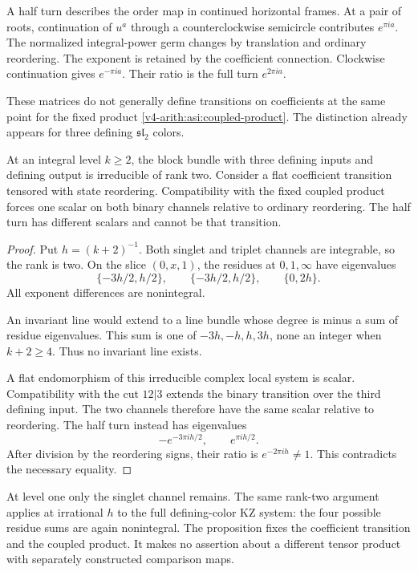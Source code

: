 A half turn describes the order map in continued horizontal
frames. At a pair of roots, continuation of \(u^a\) through a
counterclockwise semicircle contributes \(e^{\pi ia}\).
The normalized integral-power germ changes by translation and
ordinary reordering. The exponent is retained by the coefficient
connection. Clockwise continuation gives \(e^{-\pi ia}\).
Their ratio is the full turn \(e^{2\pi ia}\).

These matrices do not generally define transitions on coefficients
at the same point for the fixed product
\eqref{v4-arith:asi:coupled-product}. The distinction already
appears for three defining \(\mathfrak{sl}_2\) colors.

\begin{proposition}\label{v4-arith:asi:half-turn-obstruction}
At an integral level \(k\ge2\), the block bundle with three
defining inputs and defining output is irreducible of rank two.
Consider a flat coefficient transition tensored with state
reordering. Compatibility with the fixed coupled product forces
one scalar on both binary channels relative to ordinary reordering.
The half turn has different scalars and cannot be that transition.
\end{proposition}

\begin{proof}
Put \(h=(k+2)^{-1}\). Both singlet and triplet channels are
integrable, so the rank is two. On the slice \((0,x,1)\),
the residues at \(0,1,\infty\) have eigenvalues
\[
 \{-3h/2,h/2\},\qquad
 \{-3h/2,h/2\},\qquad
 \{0,2h\}.
\]
All exponent differences are nonintegral.

An invariant line would extend to a line bundle whose degree is
minus a sum of residue eigenvalues. This sum is one of
\(-3h,-h,h,3h\), none an integer when \(k+2\ge4\).
Thus no invariant line exists.

A flat endomorphism of this irreducible complex local system is
scalar. Compatibility with the cut \(12|3\) extends the binary
transition over the third defining input. The two channels
therefore have the same scalar relative to reordering.
The half turn instead has eigenvalues
\[
 -e^{-3\pi ih/2},\qquad e^{\pi ih/2}.
\]
After division by the reordering signs, their ratio is
\(e^{-2\pi ih}\ne1\). This contradicts the necessary equality.
\end{proof}

At level one only the singlet channel remains.
The same rank-two argument applies at irrational \(h\) to the
full defining-color KZ system: the four possible residue sums
are again nonintegral. The proposition fixes the coefficient
transition and the coupled product. It makes no assertion
about a different tensor product with separately constructed
comparison maps.

